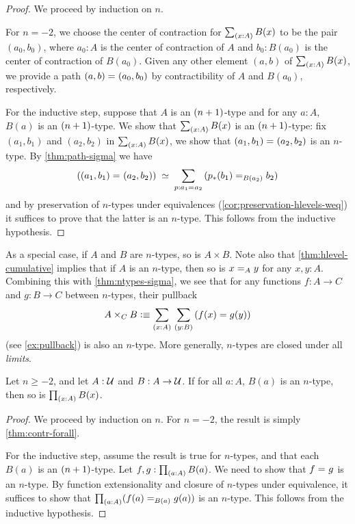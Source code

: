 \begin{proof}
 We proceed by induction on $n$.

 For $n = -2$, we choose the center of contraction for $\sm{x : A} B(x)$ to be the pair
       $(a_0, b_0)$, where $a_0 : A$ is the center of contraction of $A$ and $b_0 : B(a_0)$ is the center of contraction of $B(a_0)$.
       Given any other element $(a,b)$ of $\sm{x : A} B(x)$, we provide a path $\id{(a, b)}{(a_0,b_0)}$
       by contractibility of $A$ and $B(a_0)$, respectively.

 For the inductive step, suppose that $A$ is an $\nplusone$-type and
         for any $a : A$, $B(a)$ is an $\nplusone$-type. We show that $\sm{x : A} B(x)$ is an $\nplusone$-type:
      fix $(a_1, b_1)$ and $(a_2,b_2)$ in $\sm{x : A} B(x)$,
     we show that $\id{(a_1, b_1)}{(a_2,b_2)}$ is an $n$-type.
      By \autoref{thm:path-sigma} we have
      \[ \eqvspaced{(\id{(a_1, b_1)}{(a_2,b_2)})}{\sm{p : \id{a_1}{a_2}} (\id[B(a_2)]{\trans{p}{b_1}}{b_2})} \]
   and by preservation of $n$-types under equivalences (\autoref{cor:preservation-hlevels-weq})
   it suffices to prove that the latter is an $n$-type. This follows from the
   inductive hypothesis.
\end{proof}

As a special case, if $A$ and $B$ are $n$-types, so is $A\times B$.
Note also that \autoref{thm:hlevel-cumulative} implies that if $A$ is an $n$-type, then so is $\id[A]xy$ for any $x,y:A$.
Combining this with \autoref{thm:ntypes-sigma}, we see that for any functions $f:A\to C$ and $g:B\to C$ between $n$-types, their pullback
\[ A\times_C B \defeq \sm{x:A}{y:B} (f(x)=g(y)) \]
(see \autoref{ex:pullback}) is also an $n$-type.
More generally, $n$-types are closed under all \emph{limits}.

\begin{thm}\label{thm:hlevel-prod}
 Let $n\geq -2$, and let $A : \type$ and $B : A \to \type$.
 If for all $a : A$, $B(a)$ is an $n$-type, then so is $\prd{x : A} B(x)$.
\end{thm}

\begin{proof}
  We proceed by induction on $n$.
  For $n = -2$, the result is simply \autoref{thm:contr-forall}.

  For the inductive step, assume the result is true for $n$-types, and that each $B(a)$ is an $\nplusone$-type.
  Let $f, g : \prd{a:A}B(a)$.
  We need to show that $\id{f}{g}$ is an $n$-type.
  By function extensionality and closure of $n$-types under equivalence, it suffices to show that $\prd{a : A} (\id[B(a)]{f(a)}{g(a)})$ is an $n$-type.
  This follows from the inductive hypothesis.
\end{proof}

